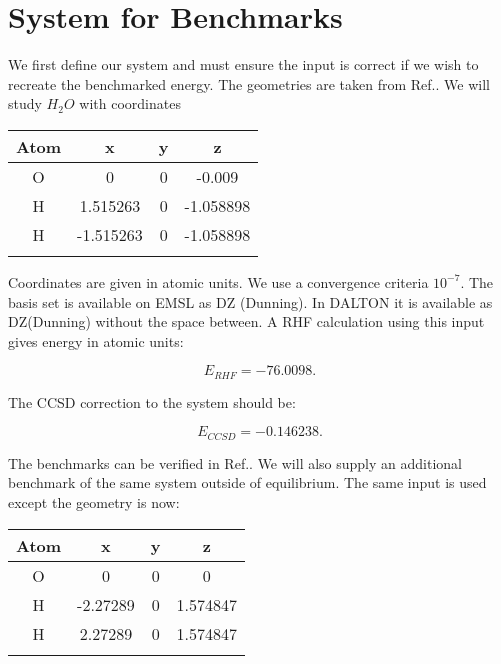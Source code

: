 \section{System for Benchmarks}
We first define our system and must ensure the input is correct if we wish to recreate the benchmarked energy. The geometries are taken from Ref.\cite{CCSDT-ref10}. We will study $H_2O$ with coordinates \\

\begin{center}
  \begin{tabular}{ c c c c }
  \hline
     Atom & x & y & z \\ \hline
     O & 0 & 0 & -0.009 \\
     H & 1.515263 & 0 & -1.058898 \\
     H & -1.515263 & 0 & -1.058898 \\
     \hline \\
  \end{tabular} 
\end{center} 

Coordinates are given in atomic units. We use a convergence criteria $10^{-7}$. The basis set is available on EMSL as DZ (Dunning). In DALTON it is available as DZ(Dunning) without the space between. A RHF calculation using this input gives energy in atomic units:

\begin{equation}
E_{RHF} = -76.0098 .
\end{equation}

The CCSD correction to the system should be:

\begin{equation}
E_{CCSD} = -0.146238 .
\end{equation}

The benchmarks can be verified in Ref.\cite{CCSDT-ref3}. We will also supply an additional benchmark of the same system outside of equilibrium. The same input is used except the geometry is now: \\

\begin{center}
  \begin{tabular}{ c c c c }
  \hline
     Atom & x & y & z \\ \hline
     O & 0 & 0 & 0 \\
     H & -2.27289   & 0 & 1.574847 \\
     H & 2.27289 & 0 & 1.574847 \\
     \hline \\
  \end{tabular} 
\end{center} 


